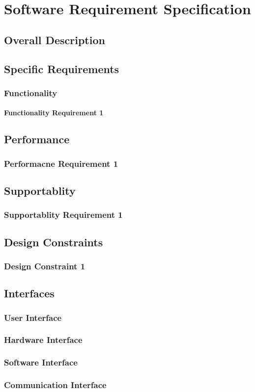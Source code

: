 \chapter{Software Requirement Specification}
\section{Overall Description}

\section{Specific Requirements}
	\subsection{Functionality}
		\subsubsection{Functionality Requirement 1}

\section{Performance}
	\subsection{Performacne Requirement 1}

\section{Supportablity}
	\subsection{Supportablity Requirement 1}

\section{Design Constraints}
	\subsection{Design Constraint 1}

\section{Interfaces}
	\subsection{User Interface}
	\subsection{Hardware Interface}
	\subsection{Software Interface}
	\subsection{Communication Interface}
